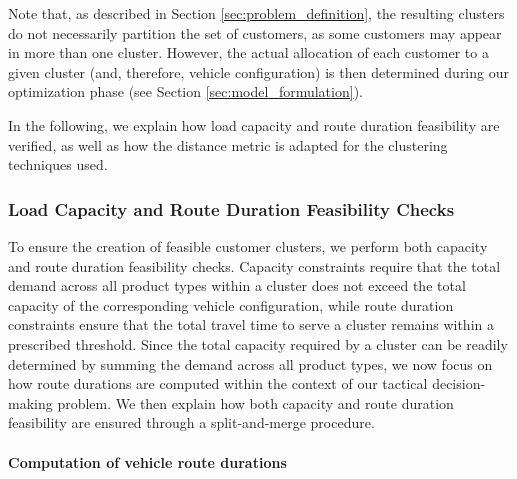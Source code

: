 \documentclass[11pt]{elsarticle}
\theoremstyle{plain}
\begin{document}
Note that, as described in Section \ref{sec:problem_definition}, the resulting clusters do not necessarily partition the set of customers, as some customers may appear in more than one cluster. However, the actual allocation of each customer to a given cluster (and, therefore, vehicle configuration) is then determined during our optimization phase (see Section \ref{sec:model_formulation}). 

In the following, we explain how load capacity and route duration feasibility are verified, as well as how the distance metric is adapted for the clustering techniques used.

\subsubsection{Load Capacity and Route Duration Feasibility Checks} \label{sec:feasibility_checks}

To ensure the creation of feasible customer clusters, we perform both capacity and route duration feasibility checks. Capacity constraints require that the total demand across all product types within a cluster does not exceed the total capacity of the corresponding vehicle configuration, while route duration constraints ensure that the total travel time to serve a cluster remains within a prescribed threshold. Since the total capacity required by a cluster can be readily determined by summing the demand across all product types, we now focus on how route durations are computed within the context of our tactical decision-making problem. We then explain how both capacity and route duration feasibility are ensured through a split-and-merge procedure.

\paragraph{Computation of vehicle route durations}
\end{document}
